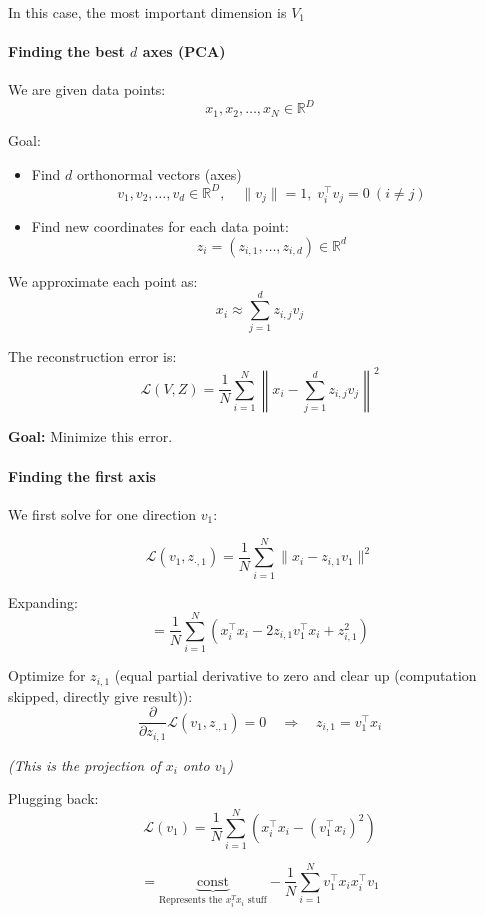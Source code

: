 \documentclass{article}
\begin{document}
In this case, the most important dimension is $V_1$
\paragraph{Finding the best $d$ axes (PCA)}

We are given data points:
\[
x_1, x_2, \dots, x_N \in \mathbb{R}^D
\]

Goal:
\begin{itemize}
    \item Find $d$ orthonormal vectors (axes)
    \[
    v_1, v_2, \dots, v_d \in \mathbb{R}^D, \quad \|v_j\| = 1, \; v_i^\top v_j = 0 \ (i \neq j)
    \]
    \item Find new coordinates for each data point:
    \[
    z_i = (z_{i,1}, \dots, z_{i,d}) \in \mathbb{R}^d
    \]
\end{itemize}

We approximate each point as:
\[
x_i \approx \sum_{j=1}^d z_{i,j} v_j
\]

The reconstruction error is:
\[
\mathcal{L}(V,Z) = \frac{1}{N} \sum_{i=1}^N \left\| x_i - \sum_{j=1}^d z_{i,j} v_j \right\|^2
\]

\textbf{Goal:} Minimize this error.

\vspace{0.5em}
\paragraph{Finding the first axis}

We first solve for one direction $v_1$:

\[
\mathcal{L}(v_1, z_{\cdot,1}) = \frac{1}{N} \sum_{i=1}^N \|x_i - z_{i,1} v_1\|^2
\]

Expanding:
\[
= \frac{1}{N} \sum_{i=1}^N \left( x_i^\top x_i - 2 z_{i,1} v_1^\top x_i + z_{i,1}^2 \right)
\]

Optimize for $z_{i,1}$ (equal partial derivative to zero and clear up (computation skipped, directly give result)):
\[
\frac{\partial}{\partial z_{i,1}}\mathcal{L}(v_1,z_{.,1}) = 0 \quad \Rightarrow \quad z_{i,1} = v_1^\top x_i
\]

\textit{(This is the projection of $x_i$ onto $v_1$)}

Plugging back:
\[
\mathcal{L}(v_1) = \frac{1}{N} \sum_{i=1}^N \left( x_i^\top x_i - (v_1^\top x_i)^2 \right)
\]

\[
= \underbrace{\text{const}}_{\text{Represents the } x_i^Tx_i \text{ stuff}} - \frac{1}{N} \sum_{i=1}^N v_1^\top x_i x_i^\top v_1
\]
\end{document}

